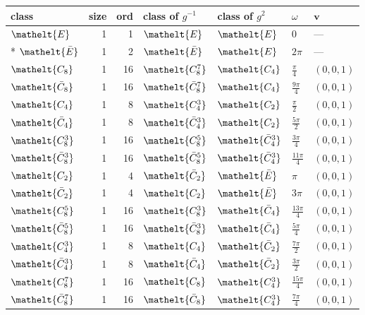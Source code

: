 \documentclass[10pt,a4paper]{article}
\numberwithin{equation}{section}
\newcommand{\eltfont}[1]{{\let\sigma\eltsigma\mathelt{#1}}}
\newcommand{\cls}[1]{\eltfont{#1}}
\newcommand{\dirvec}[3]{(#1, #2, #3)}
\newcommand{\vv}{\mathbf{v}}
\newcommand{\barred}[1]{\bar{#1}}
\begin{document}
{\renewcommand{\arraystretch}{1.3}\begin{longtable}{@{}lrrllll@{}}\toprule
class & size & ord & class of $g^{-1}$ & class of $g^{2}$ & $\omega$ & $\vv$\\\midrule\endhead
\bottomrule\endfoot\endlastfoot
$\cls{E}$ & 1 & 1 & $\cls{E}$ & $\cls{E}$ & $0$ & ---\\*
$\cls{\barred{E}}$ & 1 & 2 & $\cls{\barred{E}}$ & $\cls{E}$ & $2\pi$ & ---\\
$\cls{C_{8}}$ & 1 & 16 & $\cls{C_{8}^{7}}$ & $\cls{C_{4}}$ & $\tfrac{\pi}{4}$ & $\dirvec{0}{0}{1}$\\
$\cls{\barred{C}_{8}}$ & 1 & 16 & $\cls{\barred{C}_{8}^{7}}$ & $\cls{C_{4}}$ & $\tfrac{9\pi}{4}$ & $\dirvec{0}{0}{1}$\\
$\cls{C_{4}}$ & 1 & 8 & $\cls{C_{4}^{3}}$ & $\cls{C_{2}}$ & $\tfrac{\pi}{2}$ & $\dirvec{0}{0}{1}$\\
$\cls{\barred{C}_{4}}$ & 1 & 8 & $\cls{\barred{C}_{4}^{3}}$ & $\cls{C_{2}}$ & $\tfrac{5\pi}{2}$ & $\dirvec{0}{0}{1}$\\
$\cls{C_{8}^{3}}$ & 1 & 16 & $\cls{C_{8}^{5}}$ & $\cls{\barred{C}_{4}^{3}}$ & $\tfrac{3\pi}{4}$ & $\dirvec{0}{0}{1}$\\
$\cls{\barred{C}_{8}^{3}}$ & 1 & 16 & $\cls{\barred{C}_{8}^{5}}$ & $\cls{\barred{C}_{4}^{3}}$ & $\tfrac{11\pi}{4}$ & $\dirvec{0}{0}{1}$\\
$\cls{C_{2}}$ & 1 & 4 & $\cls{\barred{C}_{2}}$ & $\cls{\barred{E}}$ & $\pi$ & $\dirvec{0}{0}{1}$\\
$\cls{\barred{C}_{2}}$ & 1 & 4 & $\cls{C_{2}}$ & $\cls{\barred{E}}$ & $3\pi$ & $\dirvec{0}{0}{1}$\\
$\cls{C_{8}^{5}}$ & 1 & 16 & $\cls{C_{8}^{3}}$ & $\cls{\barred{C}_{4}}$ & $\tfrac{13\pi}{4}$ & $\dirvec{0}{0}{1}$\\
$\cls{\barred{C}_{8}^{5}}$ & 1 & 16 & $\cls{\barred{C}_{8}^{3}}$ & $\cls{\barred{C}_{4}}$ & $\tfrac{5\pi}{4}$ & $\dirvec{0}{0}{1}$\\
$\cls{C_{4}^{3}}$ & 1 & 8 & $\cls{C_{4}}$ & $\cls{\barred{C}_{2}}$ & $\tfrac{7\pi}{2}$ & $\dirvec{0}{0}{1}$\\
$\cls{\barred{C}_{4}^{3}}$ & 1 & 8 & $\cls{\barred{C}_{4}}$ & $\cls{\barred{C}_{2}}$ & $\tfrac{3\pi}{2}$ & $\dirvec{0}{0}{1}$\\
$\cls{C_{8}^{7}}$ & 1 & 16 & $\cls{C_{8}}$ & $\cls{C_{4}^{3}}$ & $\tfrac{15\pi}{4}$ & $\dirvec{0}{0}{1}$\\
$\cls{\barred{C}_{8}^{7}}$ & 1 & 16 & $\cls{\barred{C}_{8}}$ & $\cls{C_{4}^{3}}$ & $\tfrac{7\pi}{4}$ & $\dirvec{0}{0}{1}$\\

\end{longtable}}
\end{document}
